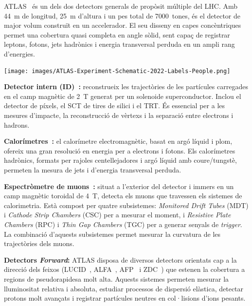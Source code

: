ATLAS~\cite{ATLAS:exp,ATLAS_run3} és un dels dos detectors generals de propòsit múltiple del LHC. Amb 44~m de longitud, 25~m d’altura i un pes total de 7000~tones, és el detector de major volum construït en un accelerador. El seu disseny en capes concèntriques permet una cobertura quasi completa en angle sòlid, sent capaç de registrar leptons, fotons, jets hadrònics i energia transversal perduda en un ampli rang d’energies.

\begin{center}
  \texttt{[image: images/ATLAS-Experiment-Schematic-2022-Labels-People.png]}
\end{center}

\textbf{Detector intern (ID)~\cite{2010_id,ATLAS:exp}:} reconstrueix les trajectòries de les partícules carregades en el camp magnètic de 2~T generat per un solenoide superconductor. Inclou el detector de píxels, el SCT de tires de silici i el TRT. És essencial per a les mesures d’impacte, la reconstrucció de vèrtexs i la separació entre electrons i hadrons.  

\textbf{Calorímetres~\cite{2010_lar,2010_tile}:} el calorímetre electromagnètic, basat en argó líquid i plom, ofereix una gran resolució en energia per a electrons i fotons. Els calorímetres hadrònics, formats per rajoles centellejadores i argó líquid amb coure/tungstè, permeten la mesura de jets i d’energia transversal perduda.  

\textbf{Espectròmetre de muons~\cite{muon_com}:} situat a l’exterior del detector i immers en un camp magnètic toroidal de 4~T, detecta els muons que travessen els sistemes de calorimetria. Està compost per quatre subsistemes:  
\textit{Monitored Drift Tubes} (MDT) i \textit{Cathode Strip Chambers} (CSC) per a mesurar el moment, i \textit{Resistive Plate Chambers} (RPC) i \textit{Thin Gap Chambers} (TGC) per a generar senyals de \textit{trigger}.  
La combinació d’aquests subsistemes permet mesurar la curvatura de les trajectòries dels muons.  

\textbf{Detectors \textit{Forward}:} ATLAS disposa de diversos detectors orientats cap a la direcció dels feixos (LUCID~\cite{Jenni:721908}, ALFA~\cite{Khalek_2016}, AFP~\cite{Adamczyk:2015cjy} i ZDC~\cite{Jenni:1009649}) que estenen la cobertura a regions de pseudorapidesa molt alta.  
Aquests sistemes permeten mesurar la lluminositat relativa i absoluta, estudiar processos de dispersió elàstica, detectar protons molt avançats i registrar partícules neutres en col·lisions d’ions pesants.  

